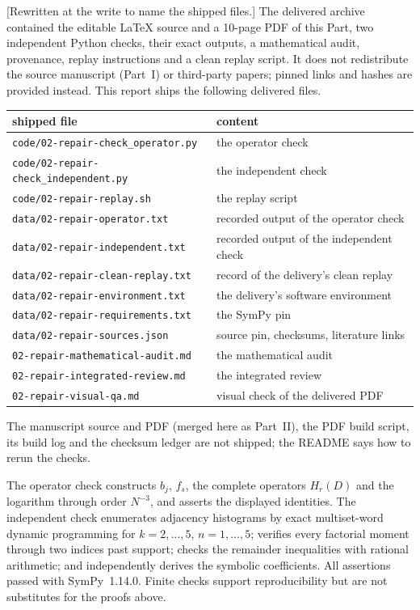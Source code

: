 \documentclass[11pt,letterpaper]{article}
\theoremstyle{definition}
\theoremstyle{remark}
\begin{document}
[Rewritten at the write to name the shipped files.]  The delivered archive
contained the editable \LaTeX{} source and a 10-page PDF of this Part, two
independent Python checks, their exact outputs, a mathematical audit,
provenance, replay instructions and a clean replay script.  It does not
redistribute the source manuscript (Part~I) or third-party papers; pinned
links and hashes are provided instead.  This report ships the following
delivered files.
\begin{center}\small
\begin{tabular}{ll}
\toprule
shipped file & content\\
\midrule
\texttt{code/02-repair-check\_operator.py} & the operator check\\
\texttt{code/02-repair-check\_independent.py} & the independent check\\
\texttt{code/02-repair-replay.sh} & the replay script\\
\texttt{data/02-repair-operator.txt} & recorded output of the operator check\\
\texttt{data/02-repair-independent.txt} & recorded output of the independent check\\
\texttt{data/02-repair-clean-replay.txt} & record of the delivery's clean replay\\
\texttt{data/02-repair-environment.txt} & the delivery's software environment\\
\texttt{data/02-repair-requirements.txt} & the SymPy pin\\
\texttt{data/02-repair-sources.json} & source pin, checksums, literature links\\
\texttt{02-repair-mathematical-audit.md} & the mathematical audit\\
\texttt{02-repair-integrated-review.md} & the integrated review\\
\texttt{02-repair-visual-qa.md} & visual check of the delivered PDF\\
\bottomrule
\end{tabular}
\end{center}
The manuscript source and PDF (merged here as Part~II), the PDF build
script, its build log and the checksum ledger are not shipped; the README
says how to rerun the checks.

The operator check constructs $b_j$, $f_s$, the complete operators $H_r(D)$
and the logarithm through order $N^{-3}$, and asserts the displayed
identities.  The independent check enumerates adjacency histograms by exact
multiset-word dynamic programming for $k=2,\ldots,5$, $n=1,\ldots,5$;
verifies every factorial moment through two indices past support; checks
the remainder inequalities with rational arithmetic; and independently
derives the symbolic coefficients.  All assertions passed with SymPy~1.14.0.
Finite checks support reproducibility but are not substitutes for the
proofs above.
\end{document}
